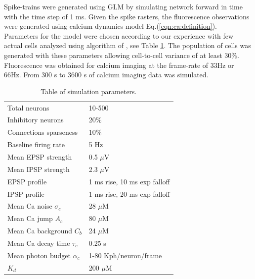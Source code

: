 \documentclass[amsmath,amssymb]{revtex4}
\begin{document}
Spike-trains were generated using GLM by simulating network forward in time with the time step of 1 ms.
Given the spike rasters, the fluorescence observations were generated using calcium dynamics model Eq.(\ref{eqn:ca:definition}). Parameters for the model were chosen according to our experience with few actual cells analyzed using algorithm of \cite{Vogelstein2009}, see Table \ref{table:caparm}.
The population of cells was generated with these parameters allowing cell-to-cell variance of at least 30\%.
Fluorescence was obtained for calcium imaging at the frame-rate of 33Hz or 66Hz.
From 300 s to 3600 s of calcium imaging data was simulated.
\begin{table}[h!b!p!]
\begin{tabular}{ll}
\hline
Total neurons & 10-500 \\
Inhibitory neurons & 20\% \\
Connections sparseness & 10\% \\
Baseline firing rate & 5 Hz \\
Mean EPSP strength & 0.5 $\mu$V \\
Mean IPSP strength & 2.3 $\mu$V\\
EPSP profile & 1 ms rise, 10 ms exp falloff \\
IPSP profile & 1 ms rise, 20 ms exp falloff \\
\hline
Mean Ca noise $\sigma_c$ & 28 $\mu$M \\
Mean Ca jump $A_c$ & 80 $\mu$M \\
Mean Ca background $C_b$ & 24 $\mu$M \\
Mean Ca decay time $\tau_c$ & 0.25 s \\
Mean photon budget $\alpha_c$ & 1-80 Kph/neuron/frame \\
$K_d$ & 200 $\mu$M \\
\hline
\end{tabular}
\caption{Table of simulation parameters.}\label{table:caparm}
\end{table}
\end{document}
